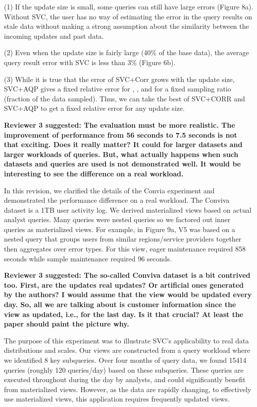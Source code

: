 \noindent  (1) If the update size is small, some queries can still have large errors (Figure 8a). Without SVC, the user has no way of estimating the error in the query results on stale data without making a strong assumption about the similarity between the incoming updates and past data. 

\noindent (2) Even when the update size is fairly large (40\% of the base data), the average query result error with SVC is less than 3\% (Figure 6b).

\noindent (3) While it is true that the error of SVC+Corr grows with the update size, SVC+AQP gives a fixed relative error for \sumfunc, \countfunc, and \avgfunc for a fixed sampling ratio (fraction of the data sampled). Thus, we can take the best of SVC+CORR and SVC+AQP to get a fixed relative error for any update size. 


\vspace{1.5em}

\textbf{Reviewer 3 suggested: The evaluation must be more realistic. The improvement of performance from 56 seconds to 7.5 seconds is not that exciting. Does it really matter? It could for larger datasets and larger workloads of queries. But, what actually happens when such datasets and queries are used is not demonstrated well. It would be interesting to see the difference on a real workload.}


In this revision, we clarified the details of the Convia experiment and demonstrated the performance difference on a real workload. The Conviva dataset is a 1TB user activity log. We derived materialized views based on actual analyst queries. Many queries were nested queries so we factored out inner queries as materialized views. For example, in Figure 9a, V5 was based on a nested query that groups users from similar regions/service providers together then aggregates over error types. For this view, eager maintenance required 858 seconds while sample maintenance required 96 seconds. 

\vspace{1.5em}

\textbf{Reviewer 3 suggested: The so-called Conviva dataset is a bit contrived too. First, are the updates real updates? Or artificial ones generated by the authors? I would assume that the view would be updated every day. So, all we are talking about is customer information since the view as updated, i.e., for the last day. Is it that crucial? At least the paper should paint the picture why.}

The purpose of this experiment was to illustrate SVC's applicability to real data distributions and scales. 
Our views are constructed from a query workload where we identified 8 key subqueries.
Over four months of query data, we found 15414 queries (roughly 120 queries/day) based on these subqueries.
These queries are executed throughout during the day by analysts, and could significantly benefit from materialized views. 
However, as the data are rapidly changing, to effectively use materialized views, this application requires frequently updated views.

